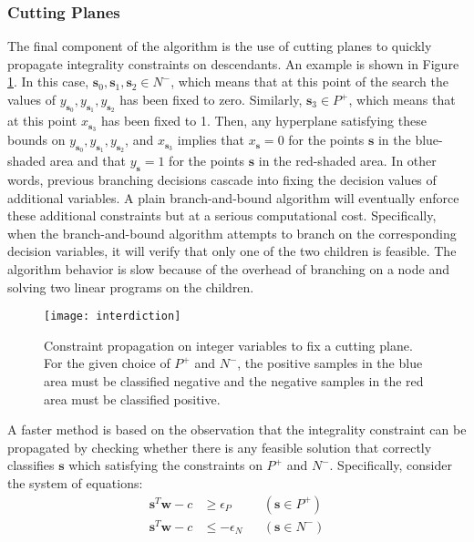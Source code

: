 \documentclass[11pt]{article}
\theoremstyle{definition}
\newcommand{\vect}[1]{\mathbf{#1}}
\newcommand{\sv}[1]{_{\vect{#1}}}
\begin{document}
\subsubsection{Cutting Planes}
\label{sec:cuts}
The final component of the algorithm is the use of cutting planes
to quickly propagate integrality constraints on descendants.
An example is shown in Figure \ref{fig:interdiction}.
In this case, $\vect{s}_0, \vect{s}_1, \vect{s}_2 \in N^-$,
which means that at this point of the search the values of 
$y_{\vect{s}_0}, y_{\vect{s}_1}, y_{\vect{s}_2}$ has been fixed to zero.
Similarly, $\vect{s}_3 \in P^+$, which means that at this point
$x_{\vect{s}_3}$ has been fixed to 1. 
Then, any hyperplane satisfying these bounds on 
$y_{\vect{s}_0}, y_{\vect{s}_1}, y_{\vect{s}_2}$, and $x_{\vect{s}_3}$ 
implies that $x\sv{s} = 0$ for the points $\vect{s}$ in the blue-shaded area
and that $y\sv{s} = 1$ for the points $\vect{s}$ in the red-shaded area.
In other words, previous branching decisions cascade into fixing
the decision values of additional variables.
A plain branch-and-bound algorithm will eventually enforce these
additional constraints but at a serious computational cost.
Specifically, when the branch-and-bound algorithm attempts to branch on the corresponding decision variables, 
it will verify that only one of the two children is feasible.
The algorithm behavior is slow because of the overhead of branching on a node and
solving two linear programs on the children. 
\begin{figure}
\centering
\texttt{[image: interdiction]}
\caption{Constraint propagation on integer variables to fix a cutting plane.
For the given choice of $P^+$ and $N^-$, 
the positive samples in the blue area must be classified negative
and the negative samples in the red area must be classified positive.}
\label{fig:interdiction}
\end{figure}
A faster method is based on the observation that the integrality constraint
can be propagated by checking whether there is any feasible solution 
that correctly classifies $\vect{s}$ which satisfying the constraints on 
$P^+$ and $N^-$.
Specifically, consider the system of equations:
\begin{subequations}
\label{eq:obstruction}
\begin{align}
\vect{s}^T \vect{w} - c & \geq \epsilon_P & & (\vect{s} \in P^+) \\
\vect{s}^T \vect{w} - c & \leq - \epsilon_N & & (\vect{s} \in N^-) 
\end{align}
\end{subequations}
\end{document}
